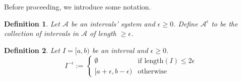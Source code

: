 \documentclass[a4paper,12pt]{article}
\newtheorem{definition}{Definition}[section]
\newcommand{\length}[1]{\mathrm{length}(#1)}
\begin{document}
\vspace{3mm}

Before proceeding, we introduce some notation.
\begin{definition} Let $\mathcal{A}$ be an intervals' system and $\epsilon \geq 0$. Define $\mathcal{A}^{\epsilon}$ to be the collection of intervals in $\mathcal{A}$ of length $\geq \epsilon$.
\end{definition}

\begin{definition} Let $I=[a,b)$ be an interval and $\epsilon \geq 0$. 
$$I^{-\epsilon}:=\begin{cases} \emptyset & \mbox{if\ $\length{I}\leq 2\epsilon$}\\ [a+\epsilon, b-\epsilon ) & \mbox{otherwise} \end{cases}$$

\end{definition}
\end{document}
